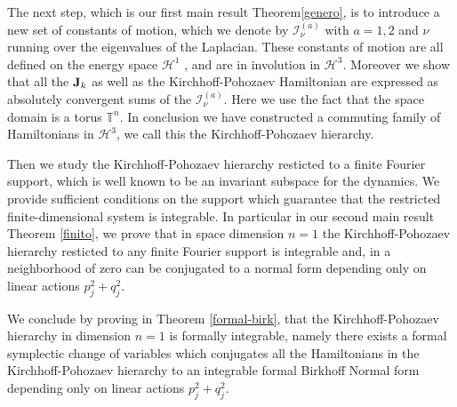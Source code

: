 \documentclass[reqno,11pt]{amsart}
\theoremstyle{plain}
\numberwithin{equation}{section}
\newcommand{\T}{\mathbb{T}}
\renewcommand{\H}{\mathcal{H}}
\newcommand{\I}{{\texttt{\bf J}}}
\newcommand{\cI}{{\mathcal I}}
\begin{document}
The next step, which is our first main result  Theorem\ref{genero}, is to introduce  a new set of constants of motion, which we denote by $\cI_{\nu}^{(a)}$ with $a=1,2$ and $\nu$ running over the eigenvalues of the Laplacian. These constants of motion are all defined on the energy space $\H^1$ , and are in involution   in $\H^3$. Moreover we show that all the $\I_k$ as well as the Kirchhoff-Pohozaev Hamiltonian are expressed as absolutely convergent sums of the  $\cI_{\nu}^{(a)}$. Here we use the fact that the space domain is a torus $\T^n$.
In conclusion we have constructed a commuting family of Hamiltonians in $\H^3$, we call this the Kirchhoff-Pohozaev hierarchy.

Then we study the Kirchhoff-Pohozaev hierarchy resticted to a  finite Fourier support, which is well known to be an invariant subspace for the dynamics. We provide sufficient conditions on the support which guarantee that the restricted finite-dimensional system is integrable. In particular in our second main result Theorem \ref{finito}, we prove that in space dimension $n=1$  the Kirchhoff-Pohozaev hierarchy resticted to any  finite Fourier support is integrable and, in a neighborhood of zero  can be conjugated to a normal form depending only  on linear actions $p_j^2+q_j^2$.

We conclude by proving in Theorem \ref{formal-birk}, that  the Kirchhoff-Pohozaev hierarchy in dimension $n=1$  is formally integrable, namely there exists a formal symplectic change of variables which conjugates all the Hamiltonians in the Kirchhoff-Pohozaev hierarchy to an integrable formal Birkhoff Normal form depending only  on linear actions $p_j^2+q_j^2$.

\bigskip
\end{document}

